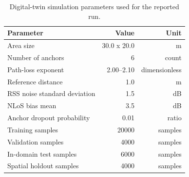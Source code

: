 \begin{table}[t]
\centering
\caption{Digital-twin simulation parameters used for the reported run.}
\label{tab:parameters}
\small
\begin{tabular}{lrr}
\toprule
Parameter & Value & Unit \\
\midrule
Area size & 30.0 x 20.0 & m \\
Number of anchors & 6 & count \\
Path-loss exponent & 2.00--2.10 & dimensionless \\
Reference distance & 1.0 & m \\
RSS noise standard deviation & 1.5 & dB \\
NLoS bias mean & 3.5 & dB \\
Anchor dropout probability & 0.01 & ratio \\
Training samples & 20000 & samples \\
Validation samples & 4000 & samples \\
In-domain test samples & 6000 & samples \\
Spatial holdout samples & 4000 & samples \\
\bottomrule
\end{tabular}
\end{table}
